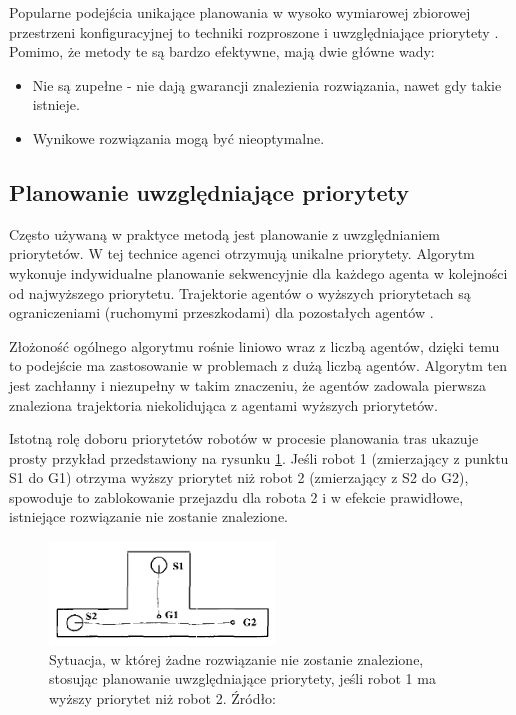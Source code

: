 Popularne podejścia unikające planowania w wysoko wymiarowej zbiorowej przestrzeni konfiguracyjnej to techniki rozproszone i uwzględniające priorytety \cite{optpriorities}.
Pomimo, że metody te są bardzo efektywne, mają dwie główne wady:
\vspace{-0.5em}
\begin{itemize}[noitemsep]
	\item Nie są zupełne - nie dają gwarancji znalezienia rozwiązania, nawet gdy takie istnieje.
	\item Wynikowe rozwiązania mogą być nieoptymalne.
\end{itemize}


\subsection{Planowanie uwzględniające priorytety}
Często używaną w praktyce metodą jest planowanie z uwzględnianiem priorytetów. 
W tej technice agenci otrzymują unikalne priorytety. Algorytm wykonuje indywidualne planowanie sekwencyjnie dla każdego agenta w kolejności od najwyższego priorytetu. Trajektorie agentów o wyższych priorytetach są ograniczeniami (ruchomymi przeszkodami) dla pozostałych agentów \cite{async_decentralized_spacetime_cp}.

Złożoność ogólnego algorytmu rośnie liniowo wraz z liczbą agentów, dzięki temu to podejście ma zastosowanie w problemach z dużą liczbą agentów.
Algorytm ten jest zachłanny i niezupełny w takim znaczeniu, że agentów zadowala pierwsza znaleziona trajektoria niekolidująca z agentami wyższych priorytetów. 

Istotną rolę doboru priorytetów robotów w procesie planowania tras ukazuje prosty przykład przedstawiony na rysunku \ref{fig:image_article1_fig1}. Jeśli robot 1 (zmierzający z punktu S1 do G1) otrzyma wyższy priorytet niż robot 2 (zmierzający z S2 do G2), spowoduje to zablokowanie przejazdu dla robota 2 i w efekcie prawidłowe, istniejące rozwiązanie nie zostanie znalezione.
\begin{figure}
	\centering
	\includegraphics[width=6cm]{img/article1/fig1}
	\caption{Sytuacja, w której żadne rozwiązanie nie zostanie znalezione, stosując planowanie uwzględniające priorytety, jeśli robot 1 ma wyższy priorytet niż robot 2. Źródło: \cite{optpriorities}}
	\label{fig:image_article1_fig1}
\end{figure}

